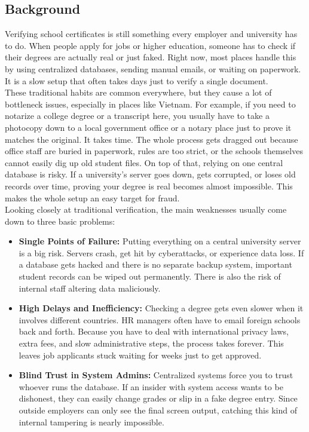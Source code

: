 \subsection{Background}

Verifying school certificates is still something every employer and university has to do. When people apply for jobs or higher education, someone has to check if their degrees are actually real or just faked. Right now, most places handle this by using centralized databases, sending manual emails, or waiting on paperwork. It is a slow setup that often takes days just to verify a single document.\\

These traditional habits are common everywhere, but they cause a lot of bottleneck issues, especially in places like Vietnam. For example, if you need to notarize a college degree or a transcript here, you usually have to take a photocopy down to a local government office or a notary place just to prove it matches the original. It takes time. The whole process gets dragged out because office staff are buried in paperwork, rules are too strict, or the schools themselves cannot easily dig up old student files. On top of that, relying on one central database is risky. If a university's server goes down, gets corrupted, or loses old records over time, proving your degree is real becomes almost impossible. This makes the whole setup an easy target for fraud.\\

Looking closely at traditional verification, the main weaknesses usually come down to three basic problems:

\begin{itemize}

    \item \textbf{Single Points of Failure:} Putting everything on a central university server is a big risk. Servers crash, get hit by cyberattacks, or experience data loss. If a database gets hacked and there is no separate backup system, important student records can be wiped out permanently. There is also the risk of internal staff altering data maliciously.

    \item \textbf{High Delays and Inefficiency:} Checking a degree gets even slower when it involves different countries. HR managers often have to email foreign schools back and forth. Because you have to deal with international privacy laws, extra fees, and slow administrative steps, the process takes forever. This leaves job applicants stuck waiting for weeks just to get approved.

    \item \textbf{Blind Trust in System Admins:} Centralized systems force you to trust whoever runs the database. If an insider with system access wants to be dishonest, they can easily change grades or slip in a fake degree entry. Since outside employers can only see the final screen output, catching this kind of internal tampering is nearly impossible.

\end{itemize}

